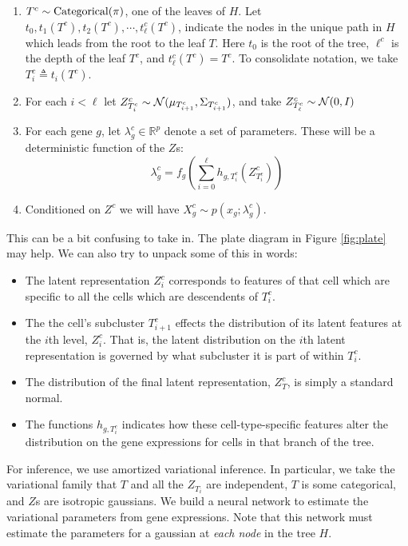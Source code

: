 \begin{enumerate}
\item $T^c \sim \operatorname*{Categorical}(\pi)$, one of the leaves of $H$.  Let $t_0,t_1(T^c),t_2(T^c),\cdots ,t_\ell^c(T^c)$, indicate the nodes in the unique path in $H$ which leads from the root to the leaf $T$.  Here $t_0$ is the root of the tree, $\ell^c$ is the depth of the leaf $T^c$, and $t^c_\ell(T^c)=T^c$.   To consolidate notation, we take $T^c_i \triangleq t_i(T^c)$.
\item For each $i<\ell$ let $Z^c_{T^c_i} \sim \mathcal{N}(\mu_{T^c_{i+1}},\Sigma_{T^c_{i+1}})$, and take $Z^c_{T^c_\ell} \sim \mathcal{N}(0,I)$
\item For each gene $g$, let $\lambda^c_g \in \mathbb R^{p}$ denote a set of parameters.  These will be a deterministic function of the $Z$s:
\[
\lambda^c_g = f_g \left(\sum_{i=0}^{\ell} h_{g,T^c_i}(Z^c_{T^c_i})\right)
\]
\item Conditioned on $Z^c$ we will have $X^c_g \sim p(x_g ; \lambda^c_g)$. 
\end{enumerate}

This can be a bit confusing to take in.  The plate diagram in Figure \ref{fig:plate} may help.  We can also try to unpack some of this in words:

\begin{itemize}
\item The latent representation $Z^c_i$ corresponds to features of that cell which are specific to all the cells which are descendents of $T^c_i$.
\item The the cell's subcluster $T^c_{i+1}$ effects the distribution of its latent features at the $i$th level, $Z^c_i$.  That is, the latent distribution on the $i$th latent representation is governed by what subcluster it is part of within $T^c_i$.
\item The distribution of the final latent representation, $Z^c_T$, is simply a standard normal.
\item The functions $h_{g,T^c_i}$ indicates how these cell-type-specific features alter the distribution on the gene expressions for cells in that branch of the tree.  
\end{itemize}

For inference, we use amortized variational inference.  In particular, we take the variational family that $T$ and all the $Z_{T_i}$ are independent, $T$ is some categorical, and $Z$s are isotropic gaussians.  We build a neural network to estimate the variational parameters from gene expressions.  Note that this network must estimate the parameters for a gaussian at \emph{each node} in the tree $H$.

